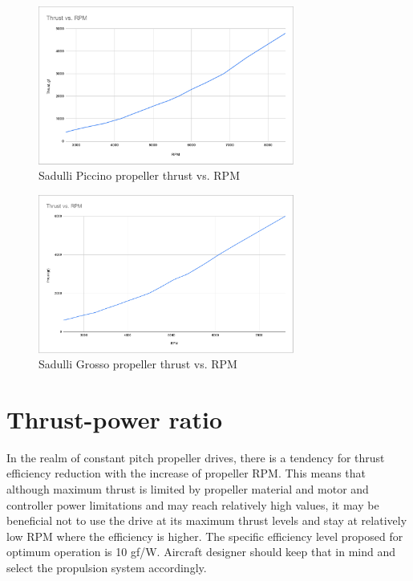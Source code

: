 \documentclass{document_templates/documentation_template_latex/zubaxdoc}
\begin{document}
\begin{figure}[!hbt]
	\centerline{\includegraphics[width=0.75\textwidth]{figures/propeller_1555.pdf}}
	\caption{Sadulli Piccino propeller thrust vs. RPM\label{Piccino_thrust}}
\end{figure}

\begin{figure}[!hbt]
	\centerline{\includegraphics[width=0.75\textwidth]{figures/propeller_1762.pdf}}
	\caption{Sadulli Grosso propeller thrust vs. RPM\label{Grosso_thrust}}
\end{figure}

\newpage

\section{Thrust-power ratio}

In the realm of constant pitch propeller drives, there is a tendency for thrust efficiency reduction with the increase of propeller RPM. This means that although maximum thrust is limited by propeller material and motor and controller power limitations and may reach relatively high values,  it may be beneficial not to use the drive at its maximum thrust levels and stay at relatively low RPM where the efficiency is higher. The specific efficiency level proposed for optimum operation is 10 gf/W. Aircraft designer should keep that in mind and select the propulsion system accordingly.
\end{document}
